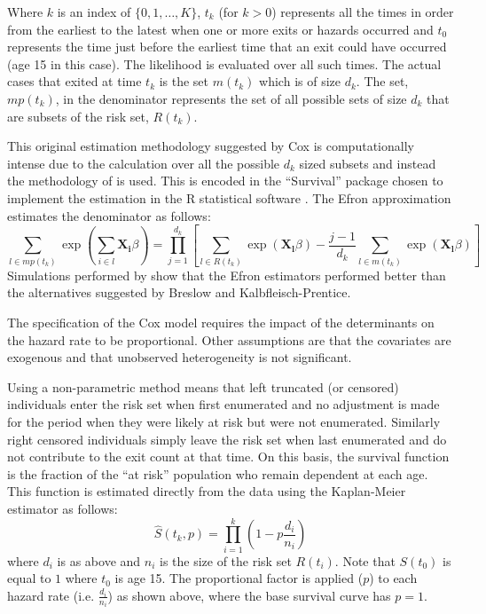 \documentclass[12pt]{article}
\begin{document}
Where $k$ is an index of $\{0, 1, \dots, K\}$, $t_k$ (for $k>0$) represents all the times in order from the earliest to the latest when one or more exits or hazards occurred and $t_0$ represents the time just before the earliest time that an exit could have occurred (age 15 in this case). The likelihood is evaluated over all such times. The actual cases that exited at time $t_k$ is the set $m(t_k)$ which is of size $d_k$. The set, $mp(t_k)$, in the denominator represents the set of all possible sets of size $d_k$ that are subsets of the risk set, $R(t_k)$.

This original estimation methodology suggested by Cox is computationally intense due to the calculation over all the possible $d_k$ sized subsets and instead the methodology of \cite{efron1977efficiency} is used. This is encoded in the ``Survival'' package chosen to implement the estimation in the R statistical software \parencite{survival}. The Efron approximation estimates the denominator as follows:
\[  \sum_{l \in mp(t_k)}\exp \left( \sum_{i \in l}\mathbf{X_i}  \beta \right) = \prod_{j=1}^{d_k}\left[\sum_{l \in R(t_k)}\exp(\mathbf{X_l}\beta) - \frac{j-1}{d_k}\sum_{l \in m(t_k)} \exp (\mathbf{X_l}\beta) \right] \]
Simulations performed by \cite{hertz1997validity} show that the Efron estimators performed better than the alternatives suggested by Breslow and Kalbfleisch-Prentice.

The specification of the Cox model requires the impact of the determinants on the hazard rate to be proportional. Other assumptions are that the covariates are exogenous and that unobserved heterogeneity is not significant.

Using a non-parametric method means that left truncated (or censored) individuals enter the risk set when first enumerated and no adjustment is made for the period when they were likely at risk but were not enumerated. Similarly right censored individuals simply leave the risk set when last enumerated and do not contribute to the exit count at that time. On this basis, the survival function is the fraction of the ``at risk'' population who remain dependent at each age. This function is estimated directly from the data using the Kaplan-Meier estimator as follows:
\[ \hat{S}(t_k, p)= \prod_{i=1}^k \left(1-{p \frac {d_i}{n_i}}\right) \]
where $d_i$ is as above and $n_i$ is the size of the risk set $R(t_i)$. Note that $S(t_0)$ is equal to $1$ where $t_0$ is age 15. The proportional factor is applied ($p$) to each hazard rate (i.e. $\frac {d_i}{n_i}$) as shown above, where the base survival curve has $p=1$.
\end{document}
